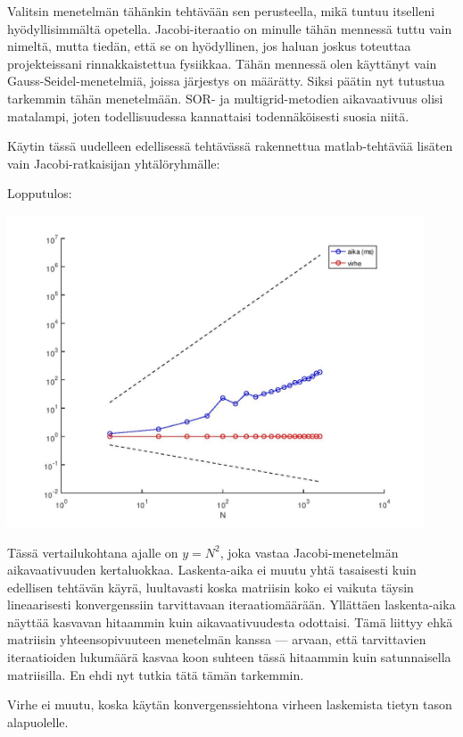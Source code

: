 \documentclass{article}
\begin{document}
Valitsin menetelmän tähänkin tehtävään sen perusteella, mikä tuntuu itselleni
hyödyllisimmältä opetella. Jacobi-iteraatio on minulle tähän mennessä tuttu
vain nimeltä, mutta tiedän, että se on hyödyllinen, jos haluan joskus toteuttaa
projekteissani rinnakkaistettua fysiikkaa. Tähän mennessä olen käyttänyt vain
Gauss-Seidel-menetelmiä, joissa järjestys on määrätty. Siksi päätin nyt
tutustua tarkemmin tähän menetelmään. SOR- ja multigrid-metodien aikavaativuus
olisi matalampi, joten todellisuudessa kannattaisi todennäköisesti suosia
niitä.

Käytin tässä uudelleen edellisessä tehtävässä rakennettua matlab-tehtävää
lisäten vain Jacobi-rat\-kaisijan yhtälöryhmälle:



Lopputulos:

\includegraphics[width=350pt]{w6_4.jpg}

Tässä vertailukohtana ajalle on $y = N^2$, joka vastaa Jacobi-menetelmän
aikavaativuuden kertaluokkaa. Laskenta-aika ei muutu yhtä tasaisesti kuin
edellisen tehtävän käyrä, luultavasti koska matriisin koko ei vaikuta täysin
lineaarisesti konvergenssiin tarvittavaan iteraatiomäärään.  Yllättäen
laskenta-aika näyttää kasvavan hitaammin kuin aikavaativuudesta odottaisi.
Tämä liittyy ehkä matriisin yhteensopivuuteen menetelmän kanssa — arvaan, että
tarvittavien iteraatioiden lukumäärä kasvaa koon suhteen tässä hitaammin kuin
satunnaisella matriisilla. En ehdi nyt tutkia tätä tämän tarkemmin.

Virhe ei muutu, koska käytän konvergenssiehtona virheen laskemista tietyn tason
alapuolelle.
\end{document}
